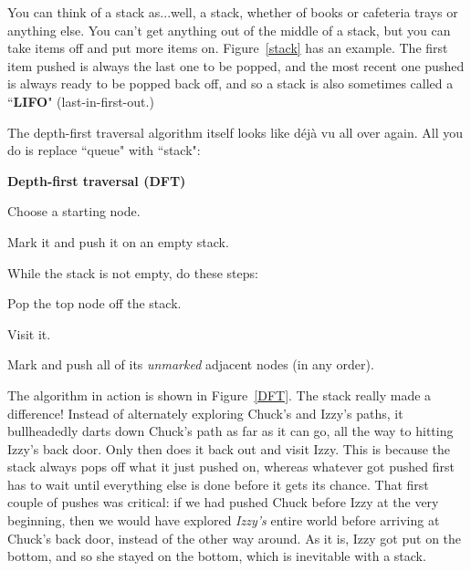 You can think of a stack as...well, a stack, whether of books or cafeteria
trays or anything else. You can't get anything out of the middle of a
stack, but you can take items off and put more items on. Figure~\ref{stack}
has an example. The first item pushed is always the last one to be popped,
and the most recent one pushed is always ready to be popped back off, and
so a stack is also sometimes called a ``\textbf{LIFO}" (last-in-first-out.)


The depth-first traversal algorithm itself looks like d\'ej\`a vu all over
again. All you do is replace ``queue" with ``stack":

\vspace{.1in}
\begin{samepage}
\begin{framed}
\textbf{Depth-first traversal (DFT)}
\begin{compactenum}
\item Choose a starting node.
\item Mark it and push it on an empty stack.
\item While the stack is not empty, do these steps:
    \begin{compactenum}
    \item Pop the top node off the stack.
    \item Visit it.
    \item Mark and push all of its \textit{unmarked} adjacent nodes (in
any order).
    \end{compactenum}
\end{compactenum}
\end{framed}
\end{samepage}
\vspace{.2in}

The algorithm in action is shown in Figure~\ref{DFT}. The stack really made
a difference! Instead of alternately exploring Chuck's and Izzy's paths, it
bullheadedly darts down Chuck's path as far as it can go, all the way to
hitting Izzy's back door. Only then does it back out and visit Izzy. This
is because the stack always pops off what it just pushed on, whereas
whatever got pushed first has to wait until everything else is done before
it gets its chance. That first couple of pushes was critical: if we had
pushed Chuck before Izzy at the very beginning, then we would have explored
\textit{Izzy's} entire world before arriving at Chuck's back door, instead
of the other way around. As it is, Izzy got put on the bottom, and so she
stayed on the bottom, which is inevitable with a stack.


